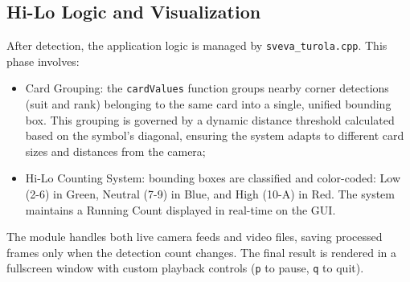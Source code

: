 \subsection{Hi-Lo Logic and Visualization}
After detection, the application logic is managed by \texttt{sveva\_turola.cpp}. This phase involves:
\begin{itemize}
    \item Card Grouping: the \texttt{cardValues} function groups nearby corner detections (suit and rank) belonging to the same 
    card into a single, unified bounding box. This grouping is governed by a dynamic distance threshold calculated based on the 
    symbol's diagonal, ensuring the system adapts to different card sizes and distances from the camera;
    \item Hi-Lo Counting System: bounding boxes are classified and color-coded: Low (2-6) in Green, Neutral (7-9) in 
    Blue, and High (10-A) in Red. The system maintains a Running Count displayed in real-time on the GUI.
\end{itemize}
The module handles both live camera feeds and video files, saving processed frames only when the detection count changes. 
The final result is rendered in a fullscreen window with custom playback controls (\texttt{p} to pause, \texttt{q} to quit).

